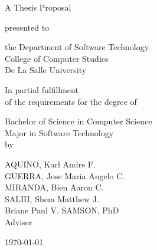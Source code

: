 %
%
%                 

\begin{titlepage}
\centering




\vspace{1.5cm}

A Thesis Proposal\\

\vspace{0.5cm}

presented to\\

\vspace{0.5cm}

the Department of Software Technology\\
College of Computer Studies\\
De La Salle University

\vspace{1cm}

In partial fulfillment\\
of the requirements for the degree of\\

\vspace{0.5cm}

Bachelor of Science in Computer Science\\
Major in Software Technology
\vspace{1.75cm}
\\by\\


\vspace{1cm}

AQUINO, Karl Andre F.  \\
GUERRA, Jose Maria Angelo C.   \\
MIRANDA, Bien Aaron C. \\
SALIH, Shem Matthew J. \\

\vspace{1.75cm}
Briane Paul V. SAMSON, PhD \\
Adviser

\vspace{1.2cm}
\today
\end{titlepage}